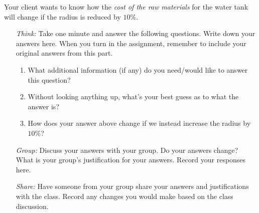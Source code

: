\documentclass[handout,noauthor]{../ximera}
\begin{document}
\begin{question} %
  Your client wants to know how the \emph{cost of the raw materials} for the
  water tank will change if the radius is reduced by $10\%$.
    \begin{itemize} 
    \item[\emph{Think:}] Take one minute and answer the following questions. Write down your answers here. When you turn in the assignment, remember to include your original answers from this part.
  \begin{enumerate}
  \item What additional information (if any) do you need/would like
    to answer this question?
    \vspace{1in}
  \item Without looking anything up, what's
    your best guess as to what the answer is?
        \vspace{.5in}

  \item How does your answer above change if we instead increase the
    radius by $10\%$?
        \vspace{.5in}

  \end{enumerate}
  
  \item[\emph{Group:}] Discuss your answers with your group. Do your answers change? What is your group's justification for your answers. Record your responses here.
  
  \vfill
  \item[\emph{Share:}] Have someone from your group share your answers and justifications with the class. Record any changes you would make based on the class discussion.
  \vfill
    \end{itemize}
\end{question}

\mynewpage
\end{document}
